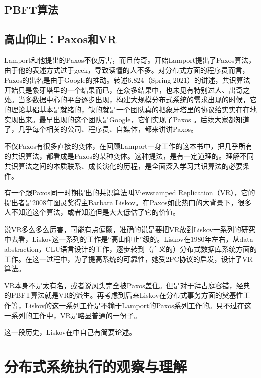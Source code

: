 \documentclass[UTF8]{ctexrep}
\begin{document}
\section{PBFT算法}


\section{高山仰止：Paxos和VR}

Lamport和他提出的Paxos不仅厉害，而且传奇。开始Lamport提出了Paxos算法，由于他的表述方式过于geek，导致读懂的人不多。对分布式方面的程序员而言，Paxos的出名是由于Google的推动。转述6.824（Spring 2021）的讲述，共识算法开始只是象牙塔里的一个结果而已，在众多结果中，也未见有特别过人、出奇之处。当多数据中心的平台逐步出现，构建大规模分布式系统的需求出现的时候，它的理论基础基本是就绪的，缺的就是一个团队真的把象牙塔里的协议给实实在在地实现出来。最早出现的这个团队是Google，它们实现了Paxos \cite{Chandra07}。后续大家都知道了，几乎每个相关的公司、程序员、自媒体，都来讲讲Paxos。

不仅Paxos有很多直接的变体，在回顾Lamport一身工作的这本书中\cite{Malkhi19}，把几乎所有的共识算法，都看成是Paxos的某种变体。这种提法，是有一定道理的。理解不同共识算法之间的本质联系、成长演化的历程，是全面深入学习共识算法的必要条件。

有一个跟Paxos同一时期提出的共识算法叫Viewstamped Replication（VR），它的提出者是2008年图灵奖得主Barbara Liskov。在Paxos如此热门的大背景下，很多人不知道这个算法，或者知道但是大大低估了它的价值。

说VR多么多么厉害，可能有点偏颇，准确的说是要把VR放到Liskov一系列的研究中去看，Liskov这一系列的工作是“高山仰止”级的。Liskov在1980年左右，从data abstraction，CLU语言设计的工作，逐步转到（广义的）分布式数据库系统方面的工作。在这一过程中，为了提高系统的可靠性，她受2PC协议的启发，设计了VR算法。

VR本身不是太有名，或者说风头完全被Paxos盖住。但是对于拜占庭容错，经典的PBFT算法就是VR的派生。再考虑到后来Liskov在分布式事务方面的奠基性工作\cite{Adya99}等，Liskov的这一系列工作是不输于Lamport的Paxos系列工作的。只不过在这一系列的工作中，VR是略显普通的一份子。

这一段历史，Liskov在\cite[Chp. 7]{Charron10}中自己有简要论述。



\chapter{分布式系统执行的观察与理解}
\end{document}
